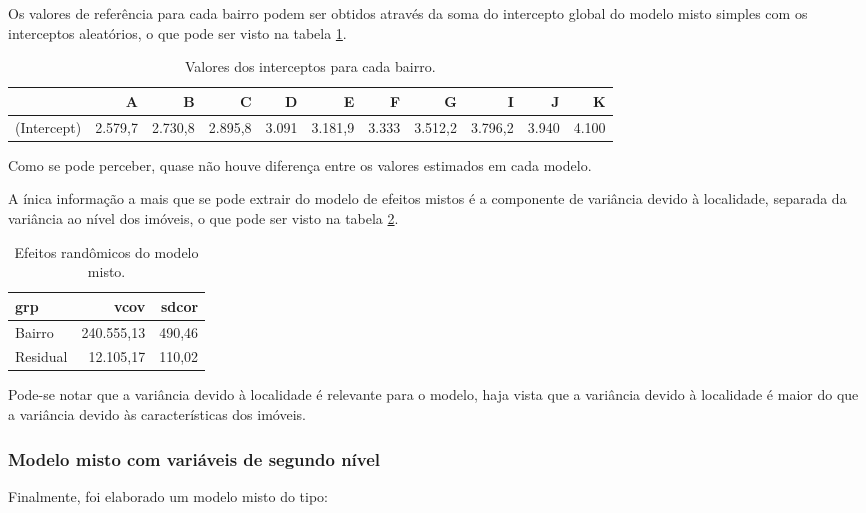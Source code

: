 \documentclass[
  a4paper, 12pt]{article}
\begin{document}
Os valores de referência para cada bairro podem ser obtidos através da
soma do intercepto global do modelo misto simples com os interceptos
aleatórios, o que pode ser visto na tabela \ref{tab:somaitcpt}.

\begin{table}

\caption{\label{tab:somaitcpt}Valores dos interceptos para cada bairro.}
\centering
\fontsize{10}{12}\selectfont
\begin{tabular}[t]{lrrrrrrrrrr}
\toprule
  & A & B & C & D & E & F & G & I & J & K\\
\midrule
(Intercept) & 2.579,7 & 2.730,8 & 2.895,8 & 3.091 & 3.181,9 & 3.333 & 3.512,2 & 3.796,2 & 3.940 & 4.100\\
\bottomrule
\end{tabular}
\end{table}

Como se pode perceber, quase não houve diferença entre os valores
estimados em cada modelo.

A ínica informação a mais que se pode extrair do modelo de efeitos
mistos é a componente de variância devido à localidade, separada da
variância ao nível dos imóveis, o que pode ser visto na tabela
\ref{tab:variancias}.

\begin{table}

\caption{\label{tab:variancias}Efeitos randômicos do modelo misto.}
\centering
\begin{tabular}[t]{lrr}
\toprule
grp & vcov & sdcor\\
\midrule
\rowcolor{gray!6}  Bairro & 240.555,13 & 490,46\\
Residual & 12.105,17 & 110,02\\
\bottomrule
\end{tabular}
\end{table}

Pode-se notar que a variância devido à localidade é relevante para o
modelo, haja vista que a variância devido à localidade é maior do que a
variância devido às características dos imóveis.

\hypertarget{modelo-misto-com-variuxe1veis-de-segundo-nuxedvel}{%
\subsubsection{Modelo misto com variáveis de segundo
nível}\label{modelo-misto-com-variuxe1veis-de-segundo-nuxedvel}}

Finalmente, foi elaborado um modelo misto do tipo:
\end{document}
